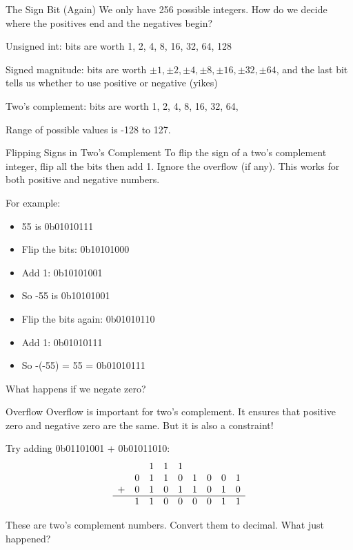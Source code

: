 \begin{frame}{The Sign Bit (Again)}
    We only have 256 possible integers. How do we decide where the positives end and the negatives begin?

    Unsigned int: bits are worth 1, 2, 4, 8, 16, 32, 64, 128

    Signed magnitude: bits are worth $\pm1, \pm2, \pm4, \pm8, \pm16, \pm32, \pm64$,
    and the last bit tells us whether to use positive or negative (yikes)

    Two's complement: bits are worth 1, 2, 4, 8, 16, 32, 64, 

    Range of possible values is -128 to 127.
\end{frame}

\begin{frame}{Flipping Signs in Two's Complement}
    To flip the sign of a two's complement integer, flip all the bits then add 1. Ignore the overflow (if any). This works for both positive and negative numbers.

    For example:
    \begin{itemize}
        \item 55 is 0b01010111
        \item Flip the bits: 0b10101000
        \item Add 1: 0b10101001
        \item So -55 is 0b10101001
        \item Flip the bits again: 0b01010110
        \item Add 1: 0b01010111
        \item So -(-55) = 55 = 0b01010111
    \end{itemize}

    What happens if we negate zero?
\end{frame}

\begin{frame}{Overflow}
    Overflow is important for two's complement. It ensures that positive zero and negative zero are the same. But it is also a constraint!

    Try adding 0b01101001 + 0b01011010:
    \[
        \begin{array}{ccccccccc}
              &   & 1 & 1 & 1 &   &   &   &   \\
              & 0 & 1 & 1 & 0 & 1 & 0 & 0 & 1 \\
            + & 0 & 1 & 0 & 1 & 1 & 0 & 1 & 0 \\
            \hline
              & 1 & 1 & 0 & 0 & 0 & 0 & 1 & 1 \\
        \end{array}
    \]

    These are two's complement numbers. Convert them to decimal. What just
    happened?

\end{frame}

